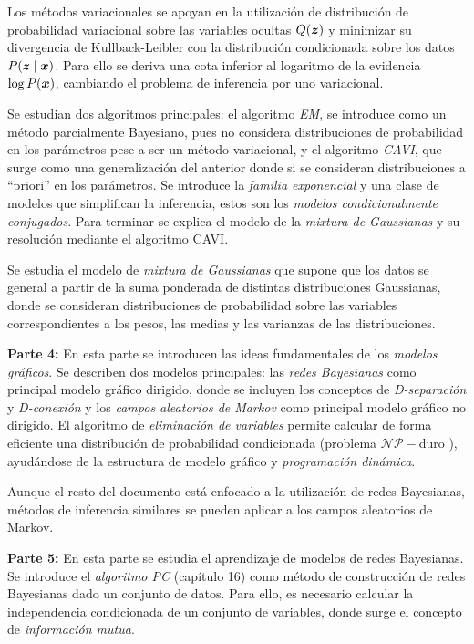 Los métodos variacionales se apoyan en la utilización de distribución de probabilidad variacional sobre las variables ocultas \(Q(\bm{z})\) y minimizar su divergencia de Kullback-Leibler con la distribución condicionada sobre los datos \(P(\bm{z} \mid \bm{x})\). Para ello se deriva una cota inferior al logaritmo de la evidencia \(\log P(\bm{x})\), cambiando el problema de inferencia por uno variacional.

Se estudian dos algoritmos principales: el algoritmo \emph{EM}, se introduce como un método parcialmente Bayesiano, pues no considera distribuciones de probabilidad en los parámetros pese a ser un método variacional, y el algoritmo \emph{CAVI}, que surge como una generalización del anterior donde si se consideran distribuciones a ``priori'' en los parámetros. Se introduce la \emph{familia exponencial} y una clase de modelos que simplifican la inferencia, estos son los \emph{modelos condicionalmente conjugados}. Para terminar se explica el modelo de la \emph{mixtura de Gaussianas} y su resolución mediante el algoritmo CAVI.

Se estudia el modelo de \emph{mixtura de Gaussianas} que supone que los datos se general a partir de la suma ponderada de distintas distribuciones Gaussianas, donde se consideran distribuciones de probabilidad sobre las variables correspondientes a los pesos, las medias y las varianzas de las distribuciones.

\textbf{Parte 4:} En esta parte se introducen las ideas fundamentales de los \emph{modelos gráficos}. Se describen dos modelos principales: las \emph{redes Bayesianas} como principal modelo gráfico dirigido, donde se incluyen los conceptos de \emph{D-separación} y \emph{D-conexión} y los \emph{campos aleatorios de Markov} como principal modelo gráfico no dirigido. El algoritmo de \emph{eliminación de variables} permite calcular de forma eficiente una distribución de probabilidad condicionada (problema \(\mathcal{NP}-\)duro ), ayudándose de la estructura de modelo gráfico y \emph{programación dinámica}.

Aunque el resto del documento está enfocado a la utilización de redes Bayesianas, métodos de inferencia similares se pueden aplicar a los campos aleatorios de Markov.

\textbf{Parte 5:} En esta parte se estudia el aprendizaje de modelos de redes Bayesianas. Se introduce el \emph{algoritmo PC} (capítulo 16) como método de construcción de redes Bayesianas dado un conjunto de datos. Para ello, es necesario calcular la independencia condicionada de un conjunto de variables, donde surge el concepto de \emph{información mutua}.

